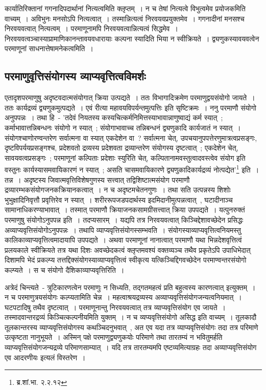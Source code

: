 		कार्यातिरिक्तानां गगनादिपदार्थानां नित्यत्वमिति क्लृप्तम्~। न च तेषां नित्यत्वे विभुत्वमेव प्रयोजकमिति वाच्यम्~। अविभुनः मनसोऽपि नित्यत्वात्~। तस्मान्नित्यत्वं निरवयवप्रयुक्तमेव~। गगनादीनां मनसश्च निरवयवत्वात् नित्यत्वम्~। परमाणूनामपि निरवयवत्वान्नित्यत्वं सिद्धमेव~। निरवयवत्वञ्चास्याप्रामाणिकानन्तावयवधारायाः कल्पना स्यादिति भिया न स्वीक्रियते~।  द्व्यणुकस्यावयवत्वेन परमाणूनां साधनात्तेषामनेकत्वमिति~। 

		\subsection{परमाणुवृत्तिसंयोगस्य व्याप्यवृत्तित्वविमर्शः}

		एतादृशपरमाणुषु अदृष्टवदात्मसंयोगात् क्रिया उत्पद्यते~। ततः विभागादिक्रमेण परमाणुद्वयसंयोगो जायते~। ततः कार्यद्रव्यं द्व्यणुकमुत्पद्यते~। एवं रीत्या महावयविपर्यन्तमुत्पत्तिः इति सृष्टिक्रमः~। ननु परमाणौ संयोगो अनुपपन्नः~। तथा हि~- {\fontsize{11.7}{0}\selectfont\s 'तदेवं नियतस्य कस्यचित्कर्मनिमित्तस्याभावान्नाणुष्वाद्यं कर्म स्यात्~; कर्माभावात्तन्निबन्धनः संयोगो न स्यात्~; संयोगाभावाच्च तन्निबन्धनं द्व्यणुकादि कार्यजातं न स्यात्~। संयोगश्चाणोरण्वन्तरेण सर्वात्मना वा स्यात् एकदेशेन वा~? सर्वात्मना चेत्, उपचयानुपपत्तेरणुमात्रत्वप्रसङ्गः, दृष्टविपर्ययप्रसङ्गश्च, प्रदेशवतो द्रव्यस्य प्रदेशवता द्रव्यान्तरेण संयोगस्य दृष्टत्वात्~; एकदेशेन चेत्, सावयवत्वप्रसङ्गः~; परमाणूनां कल्पिताः प्रदेशाः स्युरिति चेत्, कल्पितानामवस्तुत्वादवस्त्वेव संयोग इति वस्तुनः कार्यस्यासमवायिकारणं न स्यात्~; असति चासमवायिकारणे द्व्यणुकादिकार्यद्रव्यं नोत्पद्येत'\footnote{ब्र.शां.भा. २.२.१२}} इति~। तन्न~। अदृष्टस्य जिवात्मवृत्तिविशेषगुणस्य सत्त्वात् तद्विशिष्टात्मसंयोग परमाणौ द्रव्यारम्भकसंयोगजनकक्रियानकत्वात्~।‌ न च अदृष्टमचेतनगुणः~। तथा सति उत्पन्नस्य शिशोः भुभुक्षादिनिवृत्तौ प्रवृत्तिरेव न स्यात्~। शरीररूपजडपदार्थस्य इदमिदानीमुत्पन्नत्वात्~, घटादीनाञ्च सामानाधिकरण्याभावात्~। तस्मात् परमाणौ क्रियाजनकसामग्रीसत्त्वात् क्रिया उपपद्यते~। यत्पुनरुक्तं परमाणुषु संयोगोऽनुपपन्न इति~। तदप्यसारम्~। यद्यपि तत्र निरवयवत्वात् किञ्चिद्देशावच्छेदेन प्रसिद्धः अव्याप्यवृत्तिसंयोगोऽनुपपन्नः~। तथापि व्याप्यवृत्तिसंयोगस्सम्भवति~। संयोगस्याव्याप्यवृत्तित्वनियमस्तु कालिकाव्याप्यवृत्तित्वमादायापि उपपद्यते~। अथवा परमाणूनां नानात्वात् परमाणौ यथा भिन्नदेशवृत्तित्वं प्रलयकाले स्वीक्रियते तत्र यथा दिशः अवच्छेदकत्वं क्लृप्तमवश्यं वक्तव्यञ्च तथैव प्रकृतेऽपि उपाधिभेदात् दिशामपि भेदं प्रकल्प्य तत्तद्दिक्संयोगस्याव्याप्यवृत्तित्वं स्वीकृत्य यत्किञ्चिद्दिगवच्छेदेन परमाण्वन्तरसंयोगो कल्प्यते~। स च संयोगो दैशिकाव्याप्यवृत्तिरिति~।

		अत्रेदं चिन्त्यते~-  त्रुटिकारणत्वेन परमाणुः न सिध्यति, तद्गतमहत्वं प्रति बहुत्वस्य कारणत्वात् इत्युक्तम्~। न च परमाणुत्रयसंयोगः कल्प्यतामिति चेन्न~। महत्वाश्रयद्रव्यस्य अव्याप्यवृत्तिसंयोगजन्यत्वनियमात्~। घटपटादिषु तथैव दृष्टत्वात्~। परमाणूनान्तु निरवयवत्वात् तत्र व्याप्यवृत्तिसंयोग एव जायते~। तस्मादवान्तरद्रव्यं किञ्चित्कल्पनीयमिति युक्तम्~। न च व्यप्यवृत्तिसंयोगो असिद्ध इति वाच्यम्~। तूलकादौ तूलकान्तरस्य व्याप्यवृत्तिसंयोगस्य कथञ्चिदनुभवात्~, अत एव यदा तत्र व्याप्यवृत्तिसंयोगः तदा तत्र परिमाणे उत्कृष्टता नानुभूयते~। अस्मिन् पक्षे परमाणुद्व्यणुकयोः परिमाणे तथा तारतम्यं न भवितुमर्हति व्याप्यवृत्तिसंयोगजन्यद्रव्ये परिमाणसाम्यात्~। यदि तत्र तारतम्यमपि एष्टव्यमित्याग्रहः तदा अव्याप्यवृत्तिसंयोग एव आदरणीयः इत्यलं विस्तरेण~।

